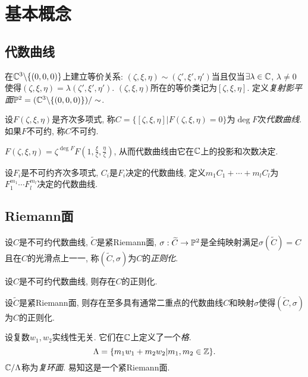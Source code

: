 \chapter{基本概念}\label{c1}
\section{代数曲线}\label{s1-1}
\begin{definition}
    在$\C^3\backslash\{(0,0,0)\}$上建立等价关系: $(\zeta,\xi,\eta)\sim(\zeta',\xi',\eta')$当且仅当$\exists\lambda\in\C$, $\lambda\neq0$使得$(\zeta,\xi,\eta)=\lambda(\zeta',\xi',\eta')$. $(\zeta,\xi,\eta)$所在的等价类记为$[\zeta,\xi,\eta]$. 定义\textit{复射影平面}$\P^2=(\C^3\backslash\{(0,0,0)\})/\sim$. 
\end{definition}
\begin{definition}
    设$F(\zeta,\xi,\eta)$是齐次多项式, 称$C=\{[\zeta,\xi,\eta]|F(\zeta,\xi,\eta)=0\}$为$\deg F$次\textit{代数曲线}. 如果$F$不可约, 称$C$不可约. 
\end{definition}
\begin{remark}$F(\zeta,\xi,\eta)=\zeta^{\deg F}F(1,\frac\xi\zeta,\frac\eta\zeta)$, 从而代数曲线由它在$\C$上的投影和次数决定. 
\end{remark}
\begin{definition}
    设$F_i$是不可约齐次多项式, $C_i$是$F_i$决定的代数曲线, 定义$m_1C_1+\cdots+m_l C_l$为$F_1^{m_1}\cdots F_l^{m_l}$决定的代数曲线. 
\end{definition}
\section{Riemann面}\label{s1-2}
\begin{definition}
    设$C$是不可约代数曲线, $\widetilde{C}$是紧Riemann面, $\sigma:\widetilde{C}\to\P^2$是全纯映射满足$\sigma(\widetilde{C})=C$且在$C$的光滑点上一一, 称$(\widetilde{C},\sigma)$为$C$的\textit{正则化}. 
\end{definition}
\begin{theorem}
    设$C$是不可约代数曲线, 则存在$C$的正则化. 
\end{theorem}
\begin{theorem}
    设$\widetilde{C}$是紧Riemann面, 则存在至多具有通常二重点的代数曲线$C$和映射$\sigma$使得$(\widetilde{C},\sigma)$为$C$的正则化. 
\end{theorem}
\begin{example}
    设复数$w_1,w_2$实线性无关. 它们在$\C$上定义了一个\textit{格}. 
    \[\Lambda=\{m_1w_1+m_2w_2|m_1,m_2\in\Z\}. \]
    $\C/\Lambda$称为\textit{复环面}. 易知这是一个紧Riemann面. 
\end{example}

